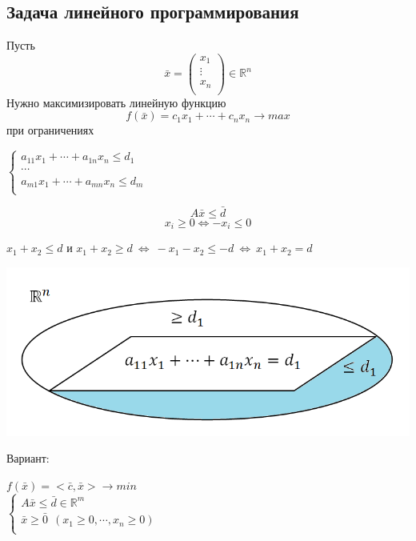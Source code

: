 \documentclass[12pt]{article}
\begin{document}
	\subsection{Задача линейного программирования}
	Пусть \[\bar x=\begin{pmatrix}
	x_1\\
	\vdots\\
	x_n\\
	\end{pmatrix} \in \mathbb{R}^n\]
	Нужно максимизировать линейную функцию $$f(\bar x)=c_1x_1+\cdots +c_nx_n \to max $$ при ограничениях
	\begin{center}
		$
		\left\{
		\begin{array}{lcl}
		a_{11}x_1+\cdots +a_{1n}x_n \leqslant d_1\\
		\cdots\\
		a_{m1}x_1+\cdots +a_{mn}x_n \leqslant d_m\\
		\end{array}
		\right.
		$
	\end{center}
	$$A\bar x \leqslant \bar d$$
	$$x_i \geqslant 0 \Leftrightarrow -x_i \leqslant 0$$
	\begin{center}
		$x_1+x_2 \leqslant d$ и $x_1+x_2 \geqslant d~\Leftrightarrow~-x_1-x_2\leqslant -d~\Leftrightarrow~x_1+x_2=d$
	\end{center}
	\begin{center}
		\includegraphics[scale=0.6]{l18_1.png}\\
	\end{center}
	Вариант:
	\begin{center}
		$f(\bar x)=<\bar c, \bar x> \to min$\\
		$
		\left\{
		\begin{array}{lcl}
		A\bar x \leqslant \bar d \in \mathbb{R}^m\\
		\bar x \geqslant \bar 0 ~~(x_1\geqslant 0, \cdots, x_n \geqslant 0)\\
		\end{array}
		\right.
		$
	\end{center}
\end{document}
